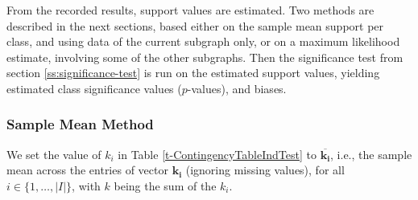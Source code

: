 \documentclass{sig-alternate}
\begin{document}
From the recorded results, support values are estimated. Two methods are described in the next sections, based either
on the sample mean support per class, and using data of the current subgraph
only, or on a maximum likelihood estimate, involving some of the other
subgraphs. Then the significance test from section \ref{ss:significance-test}
is run on the estimated support values, yielding estimated class significance values ($p$-values), 
and biases.

\subsubsection{Sample Mean Method}
\label{ss:simple-mean}
We set the value of $k_i$ in Table \ref{t-ContingencyTableIndTest} to
$\overline{\mathbf{k_i}}$, i.e., the sample mean
across the entries of vector $\mathbf{k_i}$ (ignoring missing values), for all $i \in \{1,\ldots,|I|\}$,
with $k$ being the sum of the $k_i$.
\end{document}
